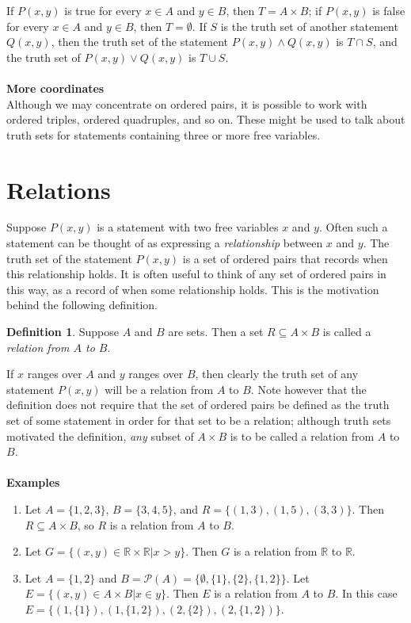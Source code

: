 \documentclass{report}
\theoremstyle{definition}
\newtheorem*{definition}{Definition}
\begin{document}
If $P(x,y)$ is true for every $x\in A$ and $y\in B$, then $T=A\times B$; if $P(x,y)$ is false for every $x\in A$ and $y\in B$, then $T=\emptyset$. If $S$ is the truth set of another statement
$Q(x,y)$, then the truth set of the statement $P(x,y)\land Q(x,y)$ is $T\cap S$, and the truth set of $P(x,y)\lor Q(x,y)$ is $T\cup S$.
\\
\vspace{1mm}\\
\textbf{More coordinates}\\
Although we may concentrate on ordered pairs, it is possible to work with ordered triples, ordered quadruples, and so on. These might be used to 
talk about truth sets for statements containing three or more free variables.
\newpage

\section{Relations}
Suppose $P(x,y)$ is a statement with two free variables $x$ and $y$. Often such a statement can be thought of as expressing a \textit{relationship} between $x$ and $y$. 
The truth set of the statement $P(x,y)$ is a set of ordered pairs that records when this relationship holds. It is often useful to think of any set of ordered pairs in this way, as a record
of when some relationship holds. This is the motivation behind the following definition.
\begin{definition}
Suppose $A$ and $B$ are sets. Then a set $R\subseteq A\times B$ is called a \textit{relation from $A$ to $B$}.
\end{definition}
\noindent If $x$ ranges over $A$ and $y$ ranges over $B$, then clearly the truth set of any statement $P(x,y)$ will be a relation from $A$ to $B$. Note however that the definition does not require 
that the set of ordered pairs be defined as the truth set of some statement in order for that set to be a relation; although truth sets motivated the definition, \textit{any} subset of $A\times B$ 
is to be called a relation from $A$ to $B$.\\
\vspace{1mm}\\
\textbf{Examples}
\begin{enumerate}
\item Let $A=\{1,2,3\}$, $B=\{3,4,5\}$, and $R=\{(1,3),(1,5),(3,3)\}$. Then $R\subseteq A\times B$, so $R$ is a relation from $A$ to $B$.
\item Let $G=\{(x,y)\in\mathbb R\times\mathbb R|x>y\}$. Then $G$ is a relation from $\mathbb R$ to $\mathbb R$.
\item Let $A=\{1,2\}$ and $B=\mathscr P(A)=\{\emptyset,\{1\},\{2\},\{1,2\}\}$. Let $E=\{(x,y)\in A\times B|x\in y\}$. Then $E$ is a relation from $A$ to $B$. In this case $E=\{(1,\{1\}),(1,\{1,2\}),
(2,\{2\}),(2,\{1,2\})\}$.
\end{enumerate}
\newpage
\end{document}
